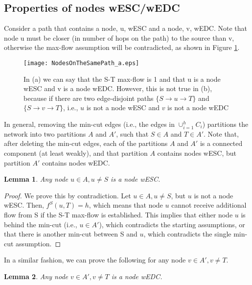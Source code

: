 \documentclass[conference]{IEEEtran}
\newtheorem{lemma}{Lemma}
\begin{document}
\subsection{Properties of nodes wESC/wEDC}
\label{SubSec:properties}
Consider a path that contains a node, u, wESC and a node, v, wEDC. Note that node u must be closer (in number of hops on the path) to the source than v, otherwise the max-flow assumption will be contradicted, as shown in Figure \ref{NodesOnTheSamePath}. 

\begin{figure}[tbh]
\centering
\texttt{[image: NodesOnTheSamePath\_a.eps]}
\caption{In (a) we can say that the S-T max-flow is 1 and that u is a node wESC and v is a node wEDC. However, this is not true in (b), because if  there are two edge-disjoint paths $\{S \rightarrow u \rightarrow T\}$ and $\{S \rightarrow v \rightarrow T\}$, i.e., $u$ is not a node wESC and $v$ is not a node wEDC}
\label{NodesOnTheSamePath}
\end{figure}

In general, removing the min-cut edges (i.e., the edges in $\cup_{i=1}^{h}C_i$) partitions the network into two partitions $A$ and $A'$, such that $S \in A$ and $T \in A'$. Note that, after deleting the min-cut edges, each of the partitions $A$ and $A'$ is a connected component (at least weakly), and that partition $A$ contains nodes wESC, but partition $A'$ contains nodes wEDC. 


\begin{lemma}
Any node $u \in A, u \neq S$ is a node wESC.
\end{lemma}

\begin{proof}
We prove this by contradiction. Let $u \in A, u \neq S$, but $u$ is not a node wESC. Then, $f^S(u,T) = h$, which means that node $u$ cannot receive additional flow from S if the S-T max-flow is established. This implies that either node $u$ is behind the min-cut (i.e., $u \in A'$), which contradicts the starting assumptions, or that there is another min-cut between S and $u$, which contradicts the single min-cut assumption.   
\end{proof}

In a similar fashion, we can prove the following for any node $v \in A', v \neq T$.

\begin{lemma}
Any node $v \in A', v \neq T$ is a node wEDC.
\end{lemma}
\end{document}
